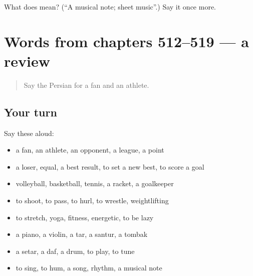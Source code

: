 \begin{tcolorbox}[breakable,colback=teal!4,colframe=teal!35!black,title={Before you move on}]
What does  mean? (\textquotedblleft{}A musical note; sheet music\textquotedblright{}.) Say it once more.
\end{tcolorbox}
\section[(dialogue)]{Words from chapters 512–519 — a review}

\label{lesson:FA-R519-review-512-519}



\begin{quote}
Say the Persian for a fan and an athlete.
\end{quote}

\subsection*{Your turn}
Say these aloud:

\begin{itemize}
\raggedright
  \item a fan, an athlete, an opponent, a league, a point
  \item a loser, equal, a best result, to set a new best, to score a goal
  \item volleyball, basketball, tennis, a racket, a goalkeeper
  \item to shoot, to pass, to hurl, to wrestle, weightlifting
  \item to stretch, yoga, fitness, energetic, to be lazy
  \item a piano, a violin, a tar, a santur, a tombak
  \item a setar, a daf, a drum, to play, to tune
  \item to sing, to hum, a song, rhythm, a musical note
\end{itemize}


